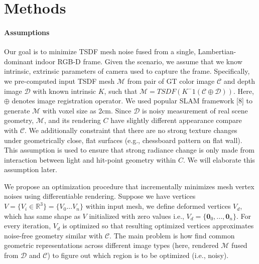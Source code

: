 \section{Methods}

\paragraph{Assumptions}
Our goal is to minimize TSDF mesh noise fused from 
a single, Lambertian-dominant indoor RGB-D frame. 
Given the scenario, we assume that we know intrinsic, extrinsic parameters of camera used to capture the frame. 
Specifically, we pre-computed input TSDF mesh $\mathcal{M}$ from 
pair of GT color image $\mathcal{C}$ and depth image $\mathcal{D}$ with known intrinsic $K$, such that $\mathcal{M}=TSDF(K^-1(\mathcal{C}\oplus\mathcal{D}))$.
Here, $\oplus$  denotes image registration operator. 
We used popular SLAM framework [8] to generate $\mathcal{M}$ with voxel size as 2cm. 
Since $\mathcal{D}$ is noisy measurement of real scene geometry, 
$\mathcal{M}$, and its rendering $C$ have slightly different appearance compare with $\mathcal{C}$. 
We additionally constraint that there are no strong texture changes 
under geometrically close, flat surfaces (e.g., chessboard pattern on flat wall). 
This assumption is used to ensure that strong radiance change is 
only made from interaction between light and hit-point geometry within $C$. 
We will elaborate this assumption later.

We propose an optimization procedure that incrementally minimizes mesh vertex noises using differentiable rendering. 
Suppose we have vertices $V=\{V_i\in\mathbb{R}^3\}=\{V_0...V_n\}$ within input mesh, we define deformed vertices $V_d$, which has same shape as $V$ initialized with zero values i.e., $V_d=\{\mathbf{0}_0,...,\mathbf{0}_n\}$. 
For every iteration, $V_d$ is optimized so that resulting optimized vertices approximates noise-free geometry similar with $\mathcal{C}$.  
The main problem is how find common geometric representations across different image types (here, rendered $\mathcal{M}$ fused from $\mathcal{D}$ and $\mathcal{C}$) 
to figure out which region is to be optimized (i.e., noisy).


